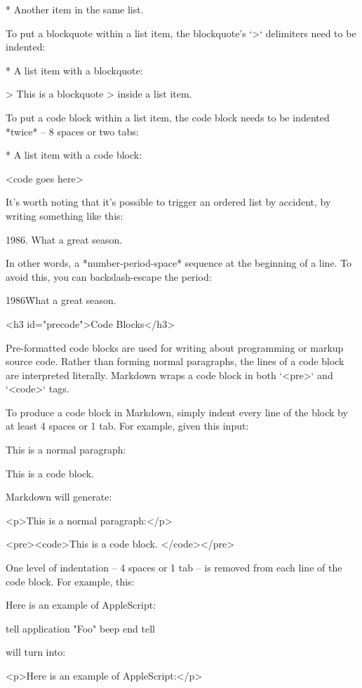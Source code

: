     *   Another item in the same list.

To put a blockquote within a list item, the blockquote's `>` delimiters need to be indented:

    *   A list item with a blockquote:

        > This is a blockquote
        > inside a list item.

To put a code block within a list item, the code block needs to be indented *twice* -- 8 spaces or two tabs:

    *   A list item with a code block:

            <code goes here>


It's worth noting that it's possible to trigger an ordered list by
accident, by writing something like this:

    1986. What a great season.

In other words, a *number-period-space* sequence at the beginning of a
line. To avoid this, you can backslash-escape the period:

    1986\. What a great season.



<h3 id="precode">Code Blocks</h3>

Pre-formatted code blocks are used for writing about programming or
markup source code. Rather than forming normal paragraphs, the lines
of a code block are interpreted literally. Markdown wraps a code block
in both `<pre>` and `<code>` tags.

To produce a code block in Markdown, simply indent every line of the
block by at least 4 spaces or 1 tab. For example, given this input:

    This is a normal paragraph:

        This is a code block.

Markdown will generate:

    <p>This is a normal paragraph:</p>

    <pre><code>This is a code block.
    </code></pre>

One level of indentation -- 4 spaces or 1 tab -- is removed from each
line of the code block. For example, this:

    Here is an example of AppleScript:

        tell application "Foo"
            beep
        end tell

will turn into:

    <p>Here is an example of AppleScript:</p>


